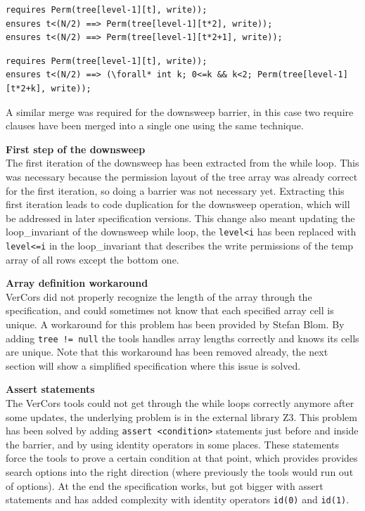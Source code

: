 \documentclass[a4paper]{article}
\newcommand{\code}[1]{\texttt{\small \color{inline}#1}} %
\begin{document}
\begin{lstlisting}[caption=Upsweep barrier permissions clauses (before merging), label=listing:specPreviousBarrier, float=htpb]
requires Perm(tree[level-1][t], write));
ensures t<(N/2) ==> Perm(tree[level-1][t*2], write));
ensures t<(N/2) ==> Perm(tree[level-1][t*2+1], write));
\end{lstlisting}

\begin{lstlisting}[caption=Upsweep barrier permissions clauses (after merging), label=listing:specBasicBarrier, float=htpb]
requires Perm(tree[level-1][t], write));
ensures t<(N/2) ==> (\forall* int k; 0<=k && k<2; Perm(tree[level-1][t*2+k], write));
\end{lstlisting}

A similar merge was required for the downsweep barrier, in this case two require clauses have been merged into a single one using the same technique.

\textbf{First step of the downsweep}\\
The first iteration of the downsweep has been extracted from the while loop. This was necessary because the permission layout of the tree array was already correct for the first iteration, so doing a barrier was not necessary yet. Extracting this first iteration leads to code duplication for the downsweep operation, which will be addressed in later specification versions. This change also meant updating the loop\_invariant of the downsweep while loop, the \code{level<i} has been replaced with \code{level<=i} in the loop\_invariant that describes the write permissions of the temp array of all rows except the bottom one.

\textbf{Array definition workaround}\\
VerCors did not properly recognize the length of the array through the specification, and could sometimes not know that each specified array cell is unique. A workaround for this problem has been provided by Stefan Blom. By adding \code{tree != null} the tools handles array lengths correctly and knows its cells are unique. Note that this workaround has been removed already, the next section will show a simplified specification where this issue is solved.

\textbf{Assert statements}\\
The VerCors tools could not get through the while loops correctly anymore after some updates, the underlying problem is in the external library Z3. This problem has been solved by adding \code{assert <condition>} statements just before and inside the barrier, and by using identity operators in some places. These statements force the tools to prove a certain condition at that point, which provides provides search options into the right direction (where previously the tools would run out of options). At the end the specification works, but got bigger with assert statements and has added complexity with identity operators \code{id(0)} and \code{id(1)}.
\end{document}
